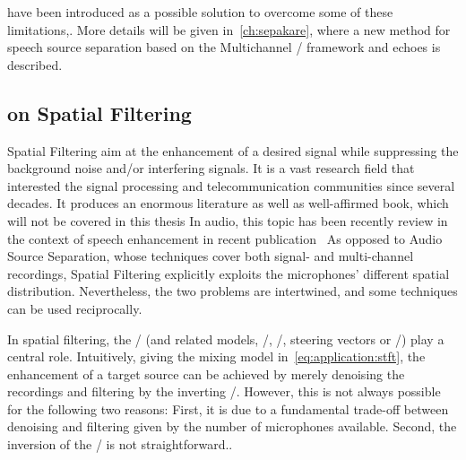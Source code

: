  have been introduced as a possible solution to overcome some of these limitations,.
More details will be given in~\cref{ch:sepakare}, where a new method for speech source separation based on the Multichannel \NMF/ framework and echoes is described.

\subsection{on Spatial Filtering}
Spatial Filtering aim at the enhancement of a desired signal while suppressing the background noise and/or interfering signals.
It is a vast research field that interested the signal processing and telecommunication communities since several decades.
It produces an enormous literature as well as well-affirmed book, which will not be covered in this thesis
In audio, this topic has been recently review in the context of speech enhancement in recent publication~
As opposed to Audio Source Separation, whose techniques cover both signal- and multi-channel recordings, Spatial Filtering explicitly exploits the microphones' different spatial distribution.
Nevertheless, the two problems are intertwined, and some techniques can be used reciprocally.

\mynewline
In spatial filtering, the \RIRs/ (and related models, \eg/, \RTFs/, steering vectors or \ReTFs/) play a central role.
Intuitively, giving the mixing model in~\cref{eq:application:stft}, the enhancement of a target source can be achieved by merely denoising the recordings and filtering by the inverting \RIRs/.
However, this is not always possible for the following two reasons:
First, it is due to a fundamental trade-off between denoising and filtering given by the number of microphones available.
Second, the inversion of the \RIRs/ is not straightforward..

